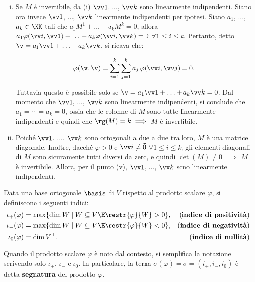 \documentclass[11pt]{article}
\begin{document}
\begin{solution}
\begin{enumerate}[(i)]
			\item Se $M$ è invertibile, da (i) $\vv1$, ..., $\vv k$ sono linearmente indipendenti. Siano ora
			invece $\vv 1$, ..., $\vv k$ linearmente indipendenti per ipotesi. Siano $a_1$, ..., $a_k \in \KK$ tali
			che $a_1 M^1 + \ldots + a_k M^k = 0$, allora $a_1 \varphi(\vv i, \vv 1) + \ldots + a_k \varphi(\vv i, \vv k) = 0$ $\forall 1 \leq i \leq k$. Pertanto, detto $\v = a_1 \vv 1 + \ldots + a_k \vv k$, si ricava che:
			
			\[ \varphi(\v, \v) = \sum_{i=1}^k \sum_{j=1}^k a_j \, \varphi(\vv i, \vv j) = 0. \]
			
			Tuttavia questo è possibile solo se $\v = a_1 \vv 1 + \ldots + a_k \vv k = 0$. Dal momento che
			$\vv 1$, ..., $\vv k$ sono linearmente indipendenti, si conclude che $a_1 = \cdots = a_k = 0$, ossia
			che le colonne di $M$ sono tutte linearmente indipendenti e quindi che $\rg(M) = k \implies$ $M$ è invertibile.
			
			\item Poiché $\vv 1$, ..., $\vv k$ sono ortogonali a due a due tra loro, $M$ è una matrice diagonale.
			Inoltre, dacché $\varphi > 0$ e $\vv i \neq \vec 0$ $\forall 1 \leq i \leq k$, gli elementi diagonali di $M$ sono sicuramente tutti diversi da zero, e quindi $\det (M) \neq 0$ $\implies$ $M$ è invertibile. Allora,
			per il punto (v), $\vv 1$, ..., $\vv k$ sono linearmente indipendenti.
		\end{enumerate}
	\end{solution}

	\begin{definition} 
		Data una base ortogonale $\basis$ di $V$ rispetto al prodotto
		scalare $\varphi$,
		si definiscono i seguenti indici:
		\begin{align*}
			\iota_+(\varphi) &= \max\{ \dim W \mid W \subseteq V \E \restr{\varphi}{W} > 0 \}, &\text{(}\textbf{indice di positività}\text{)} \\
			\iota_-(\varphi) &= \max\{ \dim W \mid W \subseteq V \E \restr{\varphi}{W} < 0 \}, &\text{(}\textbf{indice di negatività}\text{)}\\
			\iota_0(\varphi) &= \dim V^\perp. &\text{(}\textbf{indice di nullità}\text{)}
		\end{align*}
	
		Quando il prodotto scalare $\varphi$ è noto dal contesto, si
		semplifica la notazione
		scrivendo solo $\iota_+$, $\iota_-$ e $\iota_0$. In particolare,
		la terna $\sigma(\varphi) = \sigma = (i_+, i_-, i_0)$ è detta \textbf{segnatura} del
		prodotto $\varphi$.
	\end{definition}
	
\end{document}
